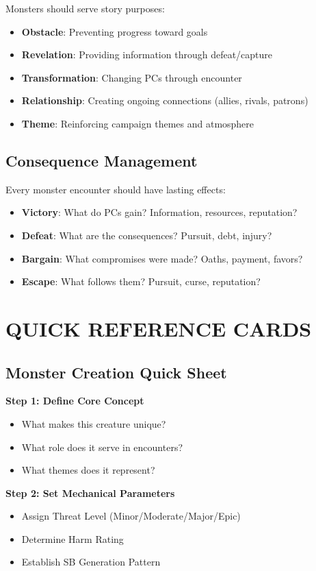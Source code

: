 \documentclass[12pt]{article}
\begin{document}
\begin{itemize}
Monsters should serve story purposes:
\begin{itemize}
\item \textbf{Obstacle}: Preventing progress toward goals
\item \textbf{Revelation}: Providing information through defeat/capture
\item \textbf{Transformation}: Changing PCs through encounter
\item \textbf{Relationship}: Creating ongoing connections (allies, rivals, patrons)
\item \textbf{Theme}: Reinforcing campaign themes and atmosphere
\end{itemize}

\subsection*{Consequence Management}

Every monster encounter should have lasting effects:
\begin{itemize}
\item \textbf{Victory}: What do PCs gain? Information, resources, reputation?
\item \textbf{Defeat}: What are the consequences? Pursuit, debt, injury?
\item \textbf{Bargain}: What compromises were made? Oaths, payment, favors?
\item \textbf{Escape}: What follows them? Pursuit, curse, reputation?
\end{itemize}

\section{QUICK REFERENCE CARDS}

\subsection*{Monster Creation Quick Sheet}

\textbf{Step 1: Define Core Concept}
\begin{itemize}
\item What makes this creature unique?
\item What role does it serve in encounters?
\item What themes does it represent?
\end{itemize}

\textbf{Step 2: Set Mechanical Parameters}
\begin{itemize}
\item Assign Threat Level (Minor/Moderate/Major/Epic)
\item Determine Harm Rating
\item Establish SB Generation Pattern
\end{itemize}


\end{itemize}
\end{document}
